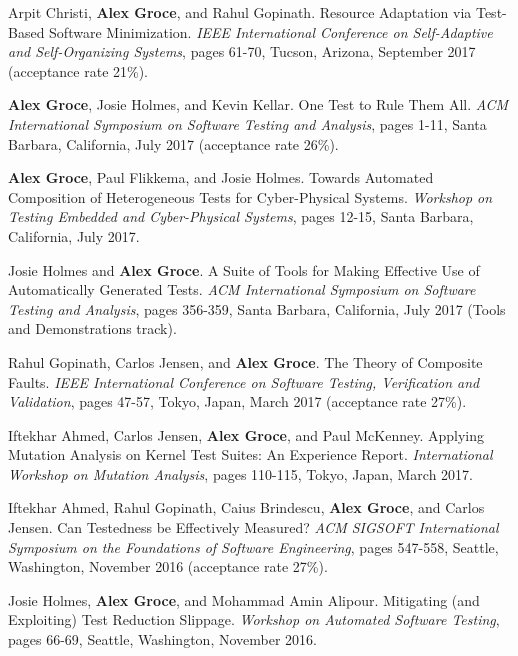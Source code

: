 \documentclass[ComputerScience]{vita}
\begin{document}
\begin{vita}
\begin{Refereed Conference and Workshop Publications}
\item Arpit Christi, {\bf Alex Groce}, and Rahul Gopinath.
\newblock Resource Adaptation via Test-Based Software Minimization.
\newblock \emph{IEEE International Conference on Self-Adaptive and Self-Organizing Systems}, pages 61-70, Tucson, Arizona, September 2017 (acceptance rate 21\%).

\item {\bf Alex Groce}, Josie Holmes, and Kevin Kellar.
\newblock One Test to Rule Them All.
\newblock \emph{ACM International Symposium on Software Testing and Analysis}, pages 1-11, Santa Barbara, California, July 2017 (acceptance rate 26\%).

\item {\bf Alex Groce}, Paul Flikkema, and Josie Holmes.
\newblock Towards Automated Composition of Heterogeneous Tests for Cyber-Physical Systems.
\newblock \emph{Workshop on Testing Embedded and Cyber-Physical Systems}, pages 12-15, Santa Barbara, California, July 2017.

\item Josie Holmes and {\bf Alex Groce}.
\newblock A Suite of Tools for Making Effective Use of Automatically Generated Tests.
\newblock \emph{ACM International Symposium on Software Testing and Analysis}, pages 356-359, Santa Barbara, California, July 2017 (Tools and Demonstrations track).

\item Rahul Gopinath, Carlos Jensen, and {\bf Alex Groce}.
\newblock The Theory of Composite Faults.
\newblock \emph{IEEE International Conference on Software Testing, Verification and Validation}, pages 47-57, Tokyo, Japan, March 2017 (acceptance rate 27\%).

\item Iftekhar Ahmed, Carlos Jensen, {\bf Alex Groce}, and Paul McKenney.
\newblock Applying Mutation Analysis on Kernel Test Suites: An Experience Report.
\newblock \emph{International Workshop on Mutation Analysis}, pages 110-115, Tokyo, Japan, March 2017.

\item Iftekhar Ahmed, Rahul Gopinath, Caius Brindescu, {\bf Alex Groce}, and Carlos Jensen.
\newblock Can Testedness be Effectively Measured?
\newblock \emph{ACM SIGSOFT International Symposium on the Foundations of Software Engineering},  pages 547-558, Seattle, Washington, November 2016 (acceptance rate 27\%).

\item Josie Holmes, {\bf Alex Groce}, and Mohammad Amin Alipour.
\newblock Mitigating (and Exploiting) Test Reduction Slippage.
\newblock \emph{Workshop on Automated Software Testing}, pages 66-69, Seattle, Washington, November 2016.


\end{Refereed Conference and Workshop Publications}
\end{vita}
\end{document}
